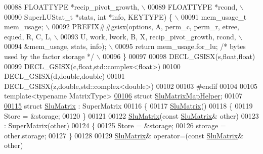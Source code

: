 \begin{DoxyCode}
00088 \textcolor{preprocessor}{         FLOATTYPE *recip\_pivot\_growth,                                                         \(\backslash\)}
00089 \textcolor{preprocessor}{         FLOATTYPE *rcond,                                                                      \(\backslash\)}
00090 \textcolor{preprocessor}{         SuperLUStat\_t *stats, int *info, KEYTYPE) \{                                            \(\backslash\)}
00091 \textcolor{preprocessor}{    mem\_usage\_t mem\_usage;                                                              \(\backslash\)}
00092 \textcolor{preprocessor}{    PREFIX##gsisx(options, A, perm\_c, perm\_r, etree, equed, R, C, L,                            \(\backslash\)}
00093 \textcolor{preprocessor}{         U, work, lwork, B, X, recip\_pivot\_growth, rcond,                                       \(\backslash\)}
00094 \textcolor{preprocessor}{         &mem\_usage, stats, info);                                                              \(\backslash\)}
00095 \textcolor{preprocessor}{    return mem\_usage.for\_lu; }\textcolor{comment}{/* bytes used by the factor storage */}\textcolor{preprocessor}{                             \(\backslash\)}
00096 \textcolor{preprocessor}{  \}}
00097 
00098 DECL\_GSISX(s,\textcolor{keywordtype}{float},\textcolor{keywordtype}{float})
00099 DECL\_GSISX(c,\textcolor{keywordtype}{float},std::complex<float>)
00100 DECL\_GSISX(d,\textcolor{keywordtype}{double},\textcolor{keywordtype}{double})
00101 DECL\_GSISX(z,\textcolor{keywordtype}{double},std::complex<double>)
00102 
00103 \textcolor{preprocessor}{#endif}
00104 
00105 \textcolor{keyword}{template}<\textcolor{keyword}{typename} MatrixType>
\hyperlink{struct_eigen_1_1_slu_matrix_map_helper}{00106} \textcolor{keyword}{struct }\hyperlink{struct_eigen_1_1_slu_matrix_map_helper}{SluMatrixMapHelper};
00107 
\hyperlink{struct_eigen_1_1_slu_matrix}{00115} \textcolor{keyword}{struct }\hyperlink{struct_eigen_1_1_slu_matrix}{SluMatrix} : SuperMatrix
00116 \{
00117   \hyperlink{struct_eigen_1_1_slu_matrix}{SluMatrix}()
00118   \{
00119     Store = &storage;
00120   \}
00121 
00122   \hyperlink{struct_eigen_1_1_slu_matrix}{SluMatrix}(\textcolor{keyword}{const} \hyperlink{struct_eigen_1_1_slu_matrix}{SluMatrix}& other)
00123     : SuperMatrix(other)
00124   \{
00125     Store = &storage;
00126     storage = other.storage;
00127   \}
00128 
00129   \hyperlink{struct_eigen_1_1_slu_matrix}{SluMatrix}& operator=(\textcolor{keyword}{const} \hyperlink{struct_eigen_1_1_slu_matrix}{SluMatrix}& other)

\end{DoxyCode}
